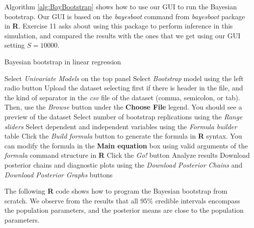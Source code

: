 Algorithm \ref{alg:BayBootstrap} shows how to use our GUI to run the Bayesian bootstrap. Our GUI is based on the \textit{bayesboot} command from \textit{bayesboot} package in \textbf{R}. Exercise 11 asks about using this package to perform inference in this simulation, and compared the results with the ones that we get using our GUI setting $S=10000$.

\begin{algorithm}[h!]
	\caption{Bayesian bootstrap in linear regression}\label{alg:BayBootstrap}
	\begin{algorithmic}[1]  		 			
		\State Select \textit{Univariate Models} on the top panel
		\State Select \textit{Bootstrap} model using the left radio button
		\State Upload the dataset selecting first if there is header in the file, and the kind of separator in the \textit{csv} file of the dataset (comma, semicolon, or tab). Then, use the \textit{Browse} button under the \textbf{Choose File} legend. You should see a preview of the dataset
		\State Select number of bootstrap replications using the \textit{Range sliders}
		\State Select dependent and independent variables using the \textit{Formula builder} table
		\State Click the \textit{Build formula} button to generate the formula in \textbf{R} syntax. You can modify the formula in the \textbf{Main equation} box using valid arguments of the \textit{formula} command structure in \textbf{R}
		\State Click the \textit{Go!} button
		\State Analyze results
		\State Download posterior chains and diagnostic plots using the \textit{Download Posterior Chains} and \textit{Download Posterior Graphs} buttons
	\end{algorithmic} 
\end{algorithm}

The following \textbf{R} code shows how to program the Bayesian bootstrap from scratch. We observe from the results that all 95\% credible intervals encompass the population parameters, and the posterior means are close to the population parameters.

